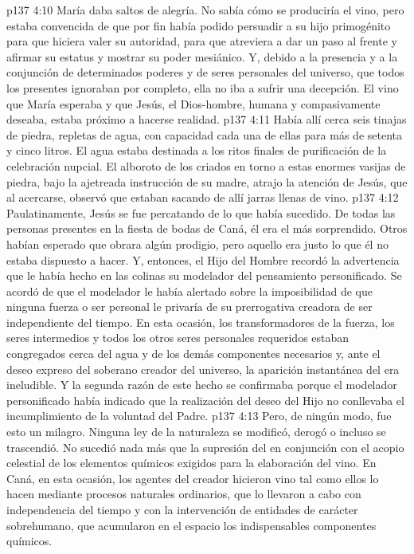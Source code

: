 \vs p137 4:10 María daba saltos de alegría. No sabía cómo se produciría el vino, pero estaba convencida de que por fin había podido persuadir a su hijo primogénito para que hiciera valer su autoridad, para que atreviera a dar un paso al frente y afirmar su estatus y mostrar su poder mesiánico. Y, debido a la presencia y a la conjunción de determinados poderes y de seres personales del universo, que todos los presentes ignoraban por completo, ella no iba a sufrir una decepción. El vino que María esperaba y que Jesús, el Dios\hyp{}hombre, humana y compasivamente deseaba, estaba próximo a hacerse realidad.
\vs p137 4:11 Había allí cerca seis tinajas de piedra, repletas de agua, con capacidad cada una de ellas para más de setenta y cinco litros. El agua estaba destinada a los ritos finales de purificación de la celebración nupcial. El alboroto de los criados en torno a estas enormes vasijas de piedra, bajo la ajetreada instrucción de su madre, atrajo la atención de Jesús, que al acercarse, observó que estaban sacando de allí jarras llenas de vino.
\vs p137 4:12 Paulatinamente, Jesús se fue percatando de lo que había sucedido. De todas las personas presentes en la fiesta de bodas de Caná, él era el más sorprendido. Otros habían esperado que obrara algún prodigio, pero aquello era justo lo que él no estaba dispuesto a hacer. Y, entonces, el Hijo del Hombre recordó la advertencia que le había hecho en las colinas su modelador del pensamiento personificado. Se acordó de que el modelador le había alertado sobre la imposibilidad de que ninguna fuerza o ser personal le privaría de su prerrogativa creadora de ser independiente del tiempo. En esta ocasión, los transformadores de la fuerza, los seres intermedios y todos los otros seres personales requeridos estaban congregados cerca del agua y de los demás componentes necesarios y, ante el deseo expreso del soberano creador del universo, la aparición instantánea del  era ineludible. Y la segunda razón de este hecho se confirmaba porque el modelador personificado había indicado que la realización del deseo del Hijo no conllevaba el incumplimiento de la voluntad del Padre.
\vs p137 4:13 Pero, de ningún modo, fue esto un milagro. Ninguna ley de la naturaleza se modificó, derogó o incluso se trascendió. No sucedió nada más que la supresión del  en conjunción con el acopio celestial de los elementos químicos exigidos para la elaboración del vino. En Caná, en esta ocasión, los agentes del creador hicieron vino tal como ellos lo hacen mediante procesos naturales ordinarios,  que lo llevaron a cabo con independencia del tiempo y con la intervención de entidades de carácter sobrehumano, que acumularon en el espacio los indispensables componentes químicos.
